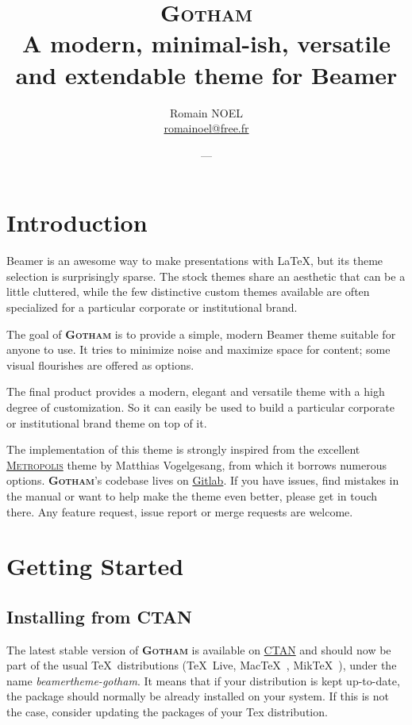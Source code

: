 \documentclass{l3doc}
\title{\textsc{Gotham}\\ A modern, minimal-ish, versatile and extendable theme for Beamer}
\author{Romain NOEL \\ \url{romainoel@free.fr}}
\date{\GothamVersion~---~\GothamDate}
\providecommand{\themename}{\textbf{\textsc{Gotham}}\xspace}
\begin{document}
\maketitle
\tableofcontents


\section{Introduction}
	Beamer is an awesome way to make presentations with \LaTeX, but its theme selection is surprisingly sparse. 
	The stock themes share an aesthetic that can be a little cluttered, while the few distinctive custom themes available are often specialized for a particular corporate or institutional brand.

	The goal of \themename is to provide a simple, modern Beamer theme suitable for anyone to use. 
	It tries to minimize noise and maximize space for content; some visual flourishes are offered as options.

	The final product provides a modern, elegant and versatile theme with a	high degree of customization.
	So it can easily be used to build a particular corporate or institutional brand theme on top of it.
 
	The implementation of this theme is strongly inspired from the excellent \href{https://github.com/matze/mtheme}{\textsc{Metropolis}} theme by Matthias Vogelgesang, from which it borrows numerous options.
	\themename's codebase lives on
	\href{https://gitlab.com/RomainNOEL/beamertheme-gotham} {Gitlab}.
	\newline
	If you have issues, find mistakes in the manual or want to help make the theme even better, please get in touch there.
	Any feature request, issue report or merge requests are welcome.


\section{Getting Started}
\subsection{Installing from CTAN}
	The latest stable version of \themename is available on
	\href{https://ctan.org/pkg/beamertheme-gotham}{CTAN} and should now be part of the usual \TeX\ distributions (\TeX\ Live, Mac\TeX\ , Mik\TeX\ ), under the name	\textit{beamertheme-gotham}. 
	It means that if your distribution is kept up-to-date, the package should normally be already installed on your system. 
	If this is not the case, consider updating the packages of your Tex distribution.
\end{document}
